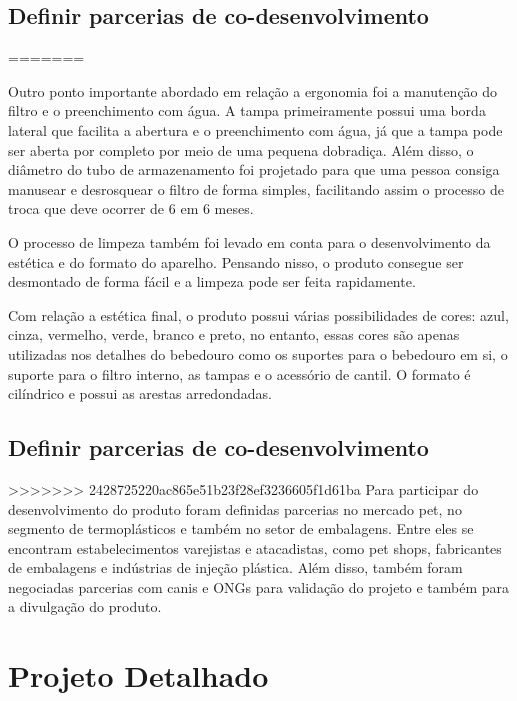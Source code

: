 \documentclass[
	12pt,				%
	openright,			%
	oneside,			%
	a4paper,			%
	english,			%
	french,				%
	spanish,			%
	brazil				%
	]{abntex2}
\begin{document}
\section{Definir parcerias de co-desenvolvimento}

=======

Outro ponto importante abordado em relação a ergonomia foi a manutenção do filtro e o preenchimento com água. A tampa primeiramente possui uma borda lateral que facilita a abertura e o preenchimento com água, já que a tampa pode ser aberta por completo por meio de uma pequena dobradiça. Além disso, o diâmetro do tubo de armazenamento foi projetado para que uma pessoa consiga manusear e desrosquear o filtro de forma simples, facilitando assim o processo de troca que deve ocorrer de 6 em 6 meses. 

O processo de limpeza também foi levado em conta para o desenvolvimento da estética e do formato do aparelho. Pensando nisso, o produto consegue ser desmontado de forma fácil e a limpeza pode ser feita rapidamente.

Com relação a estética final, o produto possui várias possibilidades de cores: azul, cinza, vermelho, verde, branco e preto, no entanto, essas cores são apenas utilizadas nos detalhes do bebedouro como os suportes para o bebedouro em si, o suporte para o filtro interno, as tampas e o acessório de cantil. O formato é cilíndrico e possui as arestas arredondadas. 


\section{Definir parcerias de co-desenvolvimento}

>>>>>>> 2428725220ac865e51b23f28ef3236605f1d61ba
Para participar do desenvolvimento do produto foram definidas parcerias no mercado pet, no segmento de termoplásticos e também no setor de embalagens. Entre eles se encontram estabelecimentos varejistas e atacadistas, como pet shops, fabricantes de embalagens e indústrias de injeção plástica. Além disso, também foram negociadas parcerias com canis e ONGs para validação do projeto e também para a divulgação do produto.


\newpage
\chapter{Projeto Detalhado}
\end{document}
